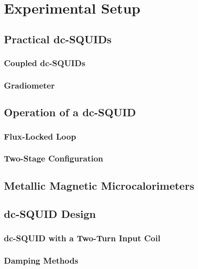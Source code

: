 \chapter{Experimental Setup}

\section{Practical dc-SQUIDs}\label{sec_practical_SQUID}

\subsection{Coupled dc-SQUIDs}

\subsection{Gradiometer}

\section{Operation of a dc-SQUID}

\subsection{Flux-Locked Loop}

\subsection{Two-Stage Configuration}

\section{Metallic Magnetic Microcalorimeters} 

\section{dc-SQUID Design}

\subsection{dc-SQUID with a Two-Turn Input Coil}


\subsection{Damping Methods}